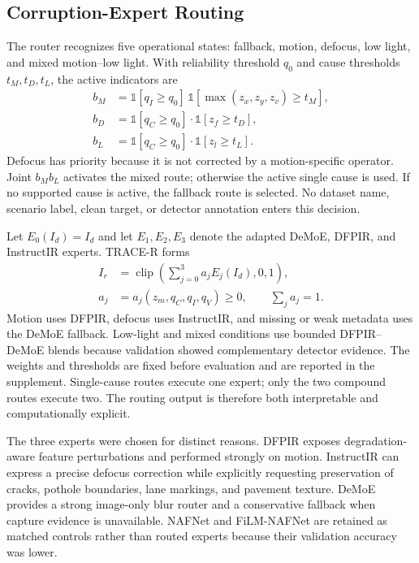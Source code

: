 \documentclass[journal]{IEEEtran}
\begin{document}
\subsection{Corruption-Expert Routing}
The router recognizes five operational states: fallback, motion, defocus, low light, and mixed motion--low light. With reliability threshold $q_0$ and cause thresholds $t_M,t_D,t_L$, the active indicators are
\begin{equation}
\begin{split}
b_M&=\mathbb{1}[q_I\ge q_0]\,
      \mathbb{1}[\max(z_x,z_y,z_v)\ge t_M],\\
b_D&=\mathbb{1}[q_C\ge q_0]\cdot\mathbb{1}[z_f\ge t_D],\\
b_L&=\mathbb{1}[q_C\ge q_0]\cdot\mathbb{1}[z_l\ge t_L].
\end{split}
\label{eq:route}
\end{equation}
Defocus has priority because it is not corrected by a motion-specific operator. Joint $b_Mb_L$ activates the mixed route; otherwise the active single cause is used. If no supported cause is active, the fallback route is selected. No dataset name, scenario label, clean target, or detector annotation enters this decision.

Let $E_0(I_d)=I_d$ and let $E_1,E_2,E_3$ denote the adapted DeMoE, DFPIR, and InstructIR experts. TRACE-R forms
\begin{equation}
\begin{aligned}
I_r&=\operatorname{clip}\!\left(
\sum_{j=0}^{3} a_j E_j(I_d),0,1\right),\\
a_j&=a_j(z_m,q_C,q_I,q_V)\ge0,
\qquad\sum_j a_j=1.
\end{aligned}
\label{eq:fusion}
\end{equation}
Motion uses DFPIR, defocus uses InstructIR, and missing or weak metadata uses the DeMoE fallback. Low-light and mixed conditions use bounded DFPIR--DeMoE blends because validation showed complementary detector evidence. The weights and thresholds are fixed before evaluation and are reported in the supplement. Single-cause routes execute one expert; only the two compound routes execute two. The routing output is therefore both interpretable and computationally explicit.

The three experts were chosen for distinct reasons. DFPIR exposes degradation-aware feature perturbations and performed strongly on motion. InstructIR can express a precise defocus correction while explicitly requesting preservation of cracks, pothole boundaries, lane markings, and pavement texture. DeMoE provides a strong image-only blur router and a conservative fallback when capture evidence is unavailable. NAFNet and FiLM-NAFNet are retained as matched controls rather than routed experts because their validation accuracy was lower.
\end{document}
